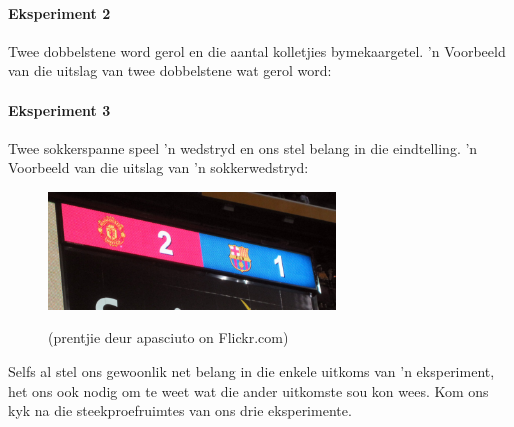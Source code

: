 \paragraph{Eksperiment 2} Twee dobbelstene word gerol en die aantal kolletjies bymekaargetel. 'n Voorbeeld van die uitslag van twee dobbelstene wat gerol word:

\begin{figure}[h]
  \begin{center}
  \end{center}
\end{figure}

\paragraph{Eksperiment 3} Twee sokkerspanne speel 'n wedstryd en ons stel belang in die eindtelling. 'n Voorbeeld van die uitslag van 'n sokkerwedstryd:

\begin{figure}[h]
  \begin{center}
    \includegraphics[width=3in]{Gr10-Probability-images/5996076302_412ec8d8d0_o.jpg}
 \\
  \begin{caption*}{(prentjie deur apasciuto on Flickr.com)}\end{caption*}
 \end{center}
\end{figure}


Selfs al stel ons gewoonlik net belang in die enkele uitkoms van 'n eksperiment, het ons ook nodig om te weet wat die ander uitkomste sou kon wees. Kom ons kyk na die steekproefruimtes van ons drie eksperimente.

